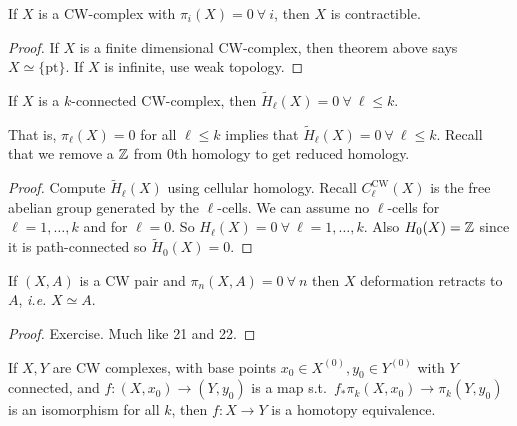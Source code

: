 \documentclass[12pt,class=article,crop=false]{standalone}
\begin{document}
\begin{coro}
If $ X$ is a CW-complex with $ \pi_{i} (X) = 0 \ \forall \ i$, then $ X$ is contractible.
\end{coro}
\begin{proof}
If $ X$ is a finite dimensional CW-complex, then theorem above says  $ X \simeq \{ \text{pt} \} $. If $ X$ is infinite, use weak topology.
\end{proof}

\begin{coro}
If $ X$ is a  $ k$-connected CW-complex, then  $ \widetilde{ H}_\ell(X) =0 \ \forall \ \ell \leq k$.
\end{coro}
That is, $ \pi_{\ell}(X)=0$ for all $ \ell \leq k$ implies that $ \widetilde{ H}_\ell (X) =0 \ \forall \ \ell \leq k$. Recall that we remove a $ \mathbb{Z}$ from 0th homology to get reduced homology.

\begin{proof}
Compute $ \widetilde{ H}_\ell(X)$ using cellular homology. Recall $ C_\ell^{ \text{CW} }(X)$ is the free abelian group generated by the $ \ell$-cells. We can assume no $ \ell$-cells for $ \ell=1,\ldots,k$ and for $ \ell=0$. So $ H_\ell(X) = 0 \ \forall \ \ell=1,\ldots,k$. Also $ H_0(X) = \mathbb{Z}$ since it is path-connected so $ \widetilde{ H}_0(X) = 0$.
\end{proof}

\begin{thm}
If $ (X,A)$ is a CW pair and  $ \pi_n(X,A) = 0 \ \forall \ n $ then $ X$ deformation retracts to  $ A$,  \emph{i.e.} $ X \simeq A$.
\end{thm}

\begin{proof}
Exercise. Much like 21 and 22.
\end{proof}

\begin{thm}[Whitehead]
If $ X,Y$ are CW complexes, with base points $ x_0 \in X^{(0)}, y_0 \in Y^{(0)}$ with $ Y$ connected, and  $ f:(X,x_0) \to  (Y,y_0)$ is a map s.t.\ $ f_* \pi_k(X,x_0) \to \pi_k(Y,y_0)$ is an isomorphism for all $ k$, then  $ f: X \to Y$ is a homotopy equivalence.
\end{thm}
\end{document}
